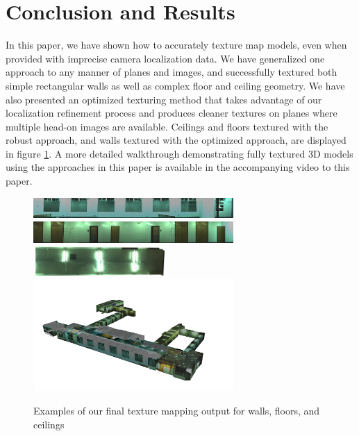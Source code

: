 \documentclass[10pt,twocolumn,letterpaper]{article}
\begin{document}
\section{Conclusion and Results}
In this paper, we have shown how to accurately texture map models,
even when provided with imprecise camera localization data. We have
generalized one approach to any manner of planes and images, and
successfully textured both simple rectangular walls as well as complex
floor and ceiling geometry. We have also presented an optimized
texturing method that takes advantage of our localization refinement
process and produces cleaner textures on planes where multiple head-on
images are available. Ceilings and floors textured with the robust
approach, and walls textured with the optimized approach, are
displayed in figure \ref{fig:results}. A more detailed walkthrough
demonstrating fully textured 3D models using the approaches in this
paper is available in the accompanying video to this paper.

\begin{figure}
  \centering
  \includegraphics[width=3in]{4thfloor21.jpg}
  \includegraphics[width=3in]{4thfloor61.jpg}
  \includegraphics[width=2in]{4thfloor8.jpg}
  \includegraphics[width=3in]{fullmodel.png}
  \caption{Examples of our final texture mapping output for walls, floors, and ceilings}
  \label{fig:results}
\end{figure}

{\small   }
\end{document}
